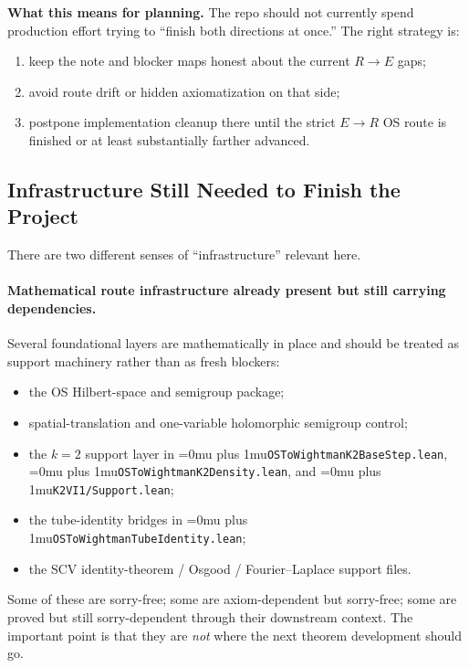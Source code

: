 \documentclass[11pt,a4paper]{article}
\newcommand{\leanfile}[1]{\begingroup\Urlmuskip=0mu plus 1mu\relax\nolinkurl{#1}\endgroup}
\begin{document}
\medskip\noindent
\textbf{What this means for planning.}
The repo should not currently spend production effort trying to ``finish both
directions at once.'' The right strategy is:
\begin{enumerate}
\item keep the note and blocker maps honest about the current $R \to E$ gaps;
\item avoid route drift or hidden axiomatization on that side;
\item postpone implementation cleanup there until the strict $E \to R$ OS route
  is finished or at least substantially farther advanced.
\end{enumerate}

\subsection{Infrastructure Still Needed to Finish the Project}

There are two different senses of ``infrastructure'' relevant here.

\paragraph{Mathematical route infrastructure already present but still carrying dependencies.}
Several foundational layers are mathematically in place and should be treated as
support machinery rather than as fresh blockers:
\begin{itemize}
\item the OS Hilbert-space and semigroup package;
\item spatial-translation and one-variable holomorphic semigroup control;
\item the $k=2$ support layer in \leanfile{OSToWightmanK2BaseStep.lean},
  \leanfile{OSToWightmanK2Density.lean}, and \leanfile{K2VI1/Support.lean};
\item the tube-identity bridges in \leanfile{OSToWightmanTubeIdentity.lean};
\item the SCV identity-theorem / Osgood / Fourier--Laplace support files.
\end{itemize}
Some of these are sorry-free; some are axiom-dependent but sorry-free; some are
proved but still sorry-dependent through their downstream context. The important
point is that they are \emph{not} where the next theorem development should go.
\end{document}
